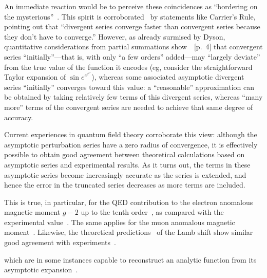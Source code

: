 \documentclass[axioms,article,accept,oneauthor,pdftex]{Definitions/mdpi}
\begin{document}
An immediate reaction would be to perceive these coincidences as ``bordering on the mysterious''~\cite{wigner}.
This spirit is corroborated~\cite{landau1906uber} by statements like Carrier's Rule, pointing out that
``divergent series converge faster than convergent series because they don't have to converge.''
However, as already surmised by Dyson, quantitative considerations from partial summations show~\cite{Bleistein-Handelsman}~[p.~4] that convergent series ``initially''---that is, with only ``a few orders'' added---may ``largely deviate'' from
the true value of the function it encodes (eg, consider the straightforward Taylor expansion of $\sin e^{e^{e^{e^e}}}$), whereas some
associated asymptotic divergent series ``initially'' converges toward
this value: a ``reasonable'' approximation can be obtained by taking
relatively few terms of this divergent series, whereas ``many more'' terms of the
convergent series are needed to achieve that same degree of accuracy.

Current experiences in quantum field theory corroborate this view: although the  asymptotic perturbation series have a zero radius of convergence,
it is effectively possible to obtain good agreement between theoretical calculations based on asymptotic series
and experimental results.
As it turns out, the terms in these asymptotic series become increasingly accurate as the series is extended,
and hence the error in the truncated series decreases as more terms are included.

This is true, in particular, for the QED contribution to the electron anomalous magnetic moment $g-2$
up to the tenth order~\cite{kinoshita-PhysRevLett.109.111807}, as compared with the experimental
value~\cite{Hanneke-PhysRevLett.100.120801,Hanneke-PhysRevA.83.052122}.
The same applies for the muon anomalous magnetic moment~\cite{kinoshita-PhysRevLett.109.111808,Keshavarzi_2022}.
Likewise, the theoretical predictions~\cite{Janka_2022} of the Lamb shift show similar good agreement with experiments~\cite{Bezginov_2019,Ohayon-PhysRevLett.128.011802}.

which are in some instances capable to reconstruct an analytic function
from its asymptotic expansion~\cite{Bruning-1996}.
\end{document}
